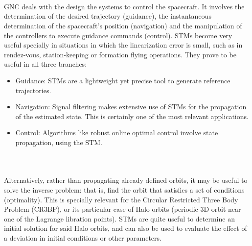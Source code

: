 	\paragraph{  \\}
	\indent GNC deals with the design the systems to control the spacecraft. It involves the determination of the desired trajectory (guidance), the instantaneous determination of the spacecraft's position (navigation) and the manipulation of the controllers to execute guidance commands (control). STMs become very useful specially in situations in which the linearization error is small, such as in rendez-vous, station-keeping or formation flying operations. They prove to be useful in all three branches:
	\begin{itemize}
	\item Guidance: STMs are a lightweight yet precise tool to generate reference trajectories.
	\item Navigation: Signal filtering makes extensive use of STMs for the propagation of the estimated state. This is certainly one of the most relevant applications.
	\item Control: Algorithms like robust online optimal control involve state propagation, using the STM.
	\end{itemize}
	\paragraph{  \\}
	\indent Alternatively, rather than propagating already defined orbits, it may be useful to solve the inverse problem: that is, find the orbit that satisfies a set of conditions (\eg optimality). This is specially relevant for the Circular Restricted Three Body Problem (CR3BP), or its particular case of Halo orbits (periodic 3D orbit near one of the Lagrange libration points). STMs are quite useful to determine an initial solution for said Halo orbits, and can also be used to evaluate the effect of a deviation in initial conditions or other parameters. 

